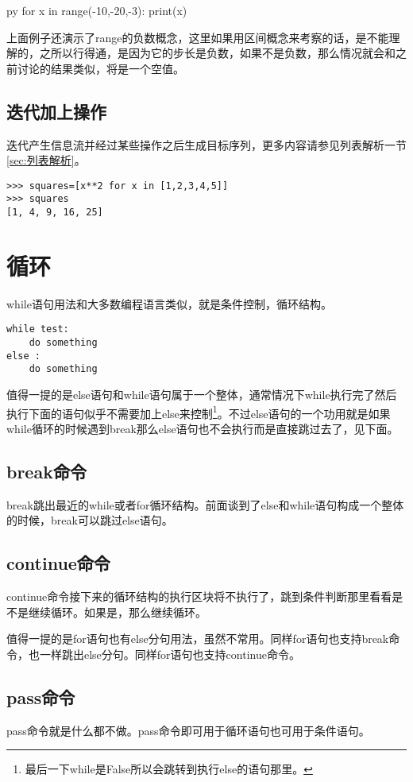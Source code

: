 \documentclass[12pt,oneside]{book}
\begin{document}
\begin{common-format}
\begin{xverbatim}[129]{py}
for x in range(-10,-20,-3):
    print(x)
\end{xverbatim}
上面例子还演示了range的负数概念，这里如果用区间概念来考察的话，是不能理解的，之所以行得通，是因为它的步长是负数，如果不是负数，那么情况就会和之前讨论的结果类似，将是一个空值。


\subsection{迭代加上操作}
迭代产生信息流并经过某些操作之后生成目标序列，更多内容请参见列表解析一节\ref{sec:列表解析}。
\begin{Verbatim}
>>> squares=[x**2 for x in [1,2,3,4,5]]
>>> squares
[1, 4, 9, 16, 25]
\end{Verbatim}



\section{循环}
while语句用法和大多数编程语言类似，就是条件控制，循环结构。
\begin{Verbatim}
while test:
    do something
else :
    do something
\end{Verbatim}

值得一提的是else语句和while语句属于一个整体，通常情况下while执行完了然后执行下面的语句似乎不需要加上else来控制\footnote{最后一下while是False所以会跳转到执行else的语句那里。}。不过else语句的一个功用就是如果while循环的时候遇到break那么else语句也不会执行而是直接跳过去了，见下面。

\subsection{break命令}
break跳出最近的while或者for循环结构。前面谈到了else和while语句构成一个整体的时候，break可以跳过else语句。

\subsection{continue命令}
continue命令接下来的循环结构的执行区块将不执行了，跳到条件判断那里看看是不是继续循环。如果是，那么继续循环。

值得一提的是for语句也有else分句用法，虽然不常用。同样for语句也支持break命令，也一样跳出else分句。同样for语句也支持continue命令。

\subsection{pass命令}
pass命令就是什么都不做。pass命令即可用于循环语句也可用于条件语句。


\end{common-format}
\end{document}
